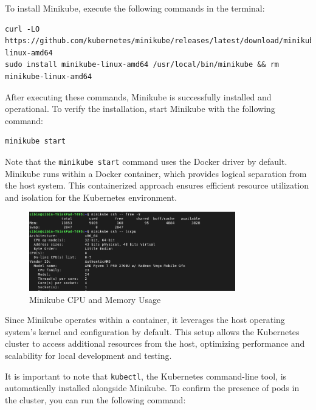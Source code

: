 To install Minikube, execute the following commands in the terminal:

\begin{lstlisting}[breaklines=true,basicstyle=\small\ttfamily,frame=single]
curl -LO https://github.com/kubernetes/minikube/releases/latest/download/minikube-linux-amd64
sudo install minikube-linux-amd64 /usr/local/bin/minikube && rm minikube-linux-amd64
\end{lstlisting}

After executing these commands, Minikube is successfully installed and operational. To verify the installation, start Minikube with the following command:

\begin{lstlisting}[breaklines=true,basicstyle=\small\ttfamily,frame=single]
minikube start
\end{lstlisting}

Note that the \texttt{minikube start} command uses the Docker driver by default. Minikube runs within a Docker container, which provides logical separation from the host system. This containerized approach ensures efficient resource utilization and isolation for the Kubernetes environment.

\begin{figure}[h!]
    \centering
    \includegraphics[width=0.8\textwidth]{implementation/minikube-cpunmem.png}
    \caption{Minikube CPU and Memory Usage}
    \label{fig:minikube-cpu-and-memory}
\end{figure}

Since Minikube operates within a container, it leverages the host operating system's kernel and configuration by default. This setup allows the Kubernetes cluster to access additional resources from the host, optimizing performance and scalability for local development and testing.

It is important to note that \texttt{kubectl}, the Kubernetes command-line tool, is automatically installed alongside Minikube. To confirm the presence of pods in the cluster, you can run the following command:

